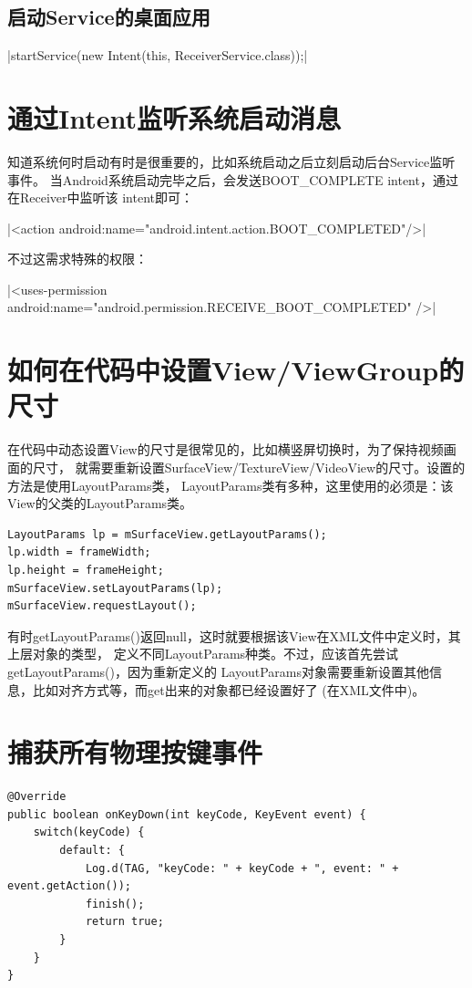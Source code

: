 ﻿\documentclass[a4paper,11pt]{article}
\begin{document}
  \subsection[启动Service的桌面应用]{启动Service的桌面应用}
  |startService(new Intent(this, ReceiverService.class));|

  \section[通过Intent监听系统启动消息]{通过Intent监听系统启动消息}
  知道系统何时启动有时是很重要的，比如系统启动之后立刻启动后台Service监听事件。
  当Android系统启动完毕之后，会发送BOOT\_COMPLETE intent，通过在Receiver中监听该
  intent即可：\par
  |<action android:name="android.intent.action.BOOT_COMPLETED"/>|

  不过这需求特殊的权限：\par
  |<uses-permission android:name="android.permission.RECEIVE_BOOT_COMPLETED" />|


  \section[如何在代码中设置View/ViewGroup的尺寸]{如何在代码中设置View/ViewGroup的尺寸}
  在代码中动态设置View的尺寸是很常见的，比如横竖屏切换时，为了保持视频画面的尺寸，
  就需要重新设置SurfaceView/TextureView/VideoView的尺寸。设置的方法是使用LayoutParams类，
  LayoutParams类有多种，这里使用的必须是：该View的父类的LayoutParams类。

\begin{verbatim}
LayoutParams lp = mSurfaceView.getLayoutParams();
lp.width = frameWidth;
lp.height = frameHeight;
mSurfaceView.setLayoutParams(lp);
mSurfaceView.requestLayout();
\end{verbatim}

  有时getLayoutParams()返回null，这时就要根据该View在XML文件中定义时，其上层对象的类型，
  定义不同LayoutParams种类。不过，应该首先尝试getLayoutParams()，因为重新定义的
  LayoutParams对象需要重新设置其他信息，比如对齐方式等，而get出来的对象都已经设置好了
  (在XML文件中)。

  \section[捕获所有物理按键事件]{捕获所有物理按键事件}
  \begin{verbatim}
@Override
public boolean onKeyDown(int keyCode, KeyEvent event) {
    switch(keyCode) {
        default: {
            Log.d(TAG, "keyCode: " + keyCode + ", event: " + event.getAction());
            finish();
            return true;
        }
    }
}
  \end{verbatim}
\end{document}
